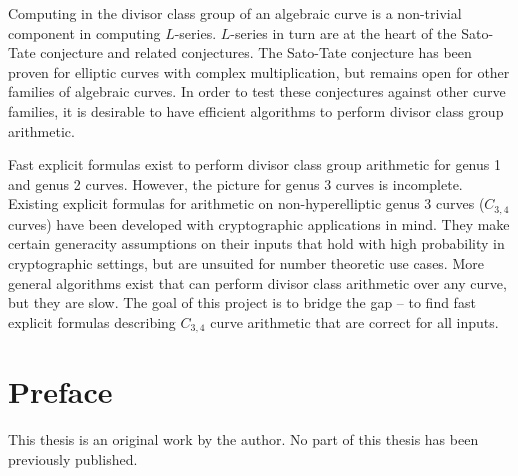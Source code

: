 \documentclass{ucalgarythesis}
\numberwithin{equation}{section}
\numberwithin{figure}{section}
\numberwithin{table}{section}
\theoremstyle{plain}
\theoremstyle{definition}
\begin{document}

\begin{thesisabstract}  

Computing in the divisor class group of an algebraic curve is a non-trivial component in computing $L$-series.
$L$-series in turn are at the heart of the Sato-Tate conjecture and related conjectures.
The Sato-Tate conjecture has been proven for elliptic curves with complex multiplication,
but remains open for other families of algebraic curves.
In order to test these conjectures against other curve families, it is desirable to have efficient algorithms to perform divisor class group arithmetic.

Fast explicit formulas exist to perform divisor class group arithmetic for genus 1 and genus 2 curves.
However, the picture for genus 3 curves is incomplete.
Existing explicit formulas for arithmetic on non-hyperelliptic genus 3 curves ($C_{3,4}$ curves) have been developed with cryptographic applications in mind.
They make certain generacity assumptions on their inputs that hold with high probability in cryptographic settings,
but are unsuited for number theoretic use cases.
More general algorithms exist that can perform divisor class arithmetic over any curve, but they are slow.
The goal of this project is to bridge the gap --
to find fast explicit formulas describing $C_{3,4}$ curve arithmetic that are correct for all inputs.

\end{thesisabstract}




  \chapter{Preface}
 
  This thesis is an original work by the author. No part of this thesis has been previously published.
 
   
\end{document}
